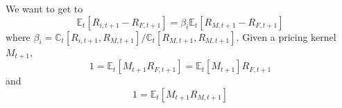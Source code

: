 \documentclass{article}
\begin{document}
\noindent We want to get to
\begin{equation}
	\mathbb{E}_{t}[R_{i,t+1}-R_{F,t+1}]=\beta_{i}\mathbb{E}_{t}[R_{M,t+1}-R_{F,t+1}]
\end{equation}
where $\beta_{i}=\mathbb{C}_{t}[R_{i,t+1},R_{M,t+1}]/\mathbb{C}_{t}[R_{M,t+1},R_{M,t+1}]$. Given a pricing kernel $M_{t+1}$, 
\begin{equation}
	1=\mathbb{E}_{t}[M_{t+1}R_{F,t+1}]=\mathbb{E}_{t}[M_{t+1}]R_{F,t+1}
\end{equation}
and
\begin{equation}
	1=\mathbb{E}_{t}[M_{t+1}R_{M,t+1}]
\end{equation}
\end{document}
